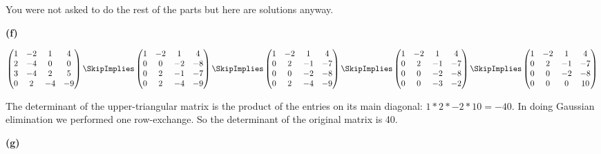 \documentclass[oneside,12pt]{amsart}
\begin{document}
\bigskip

You were not asked to do the rest of the parts but here are solutions
anyway.

\bigskip

\textbf{(f)}

\bigskip

$
\begin{pmatrix}
1 & -2 & 1 & 4 \\
2 & -4 & 0 & 0 \\
3 & -4 & 2 & 5 \\
0 & 2 & -4 & -9
\end{pmatrix}
\SkipImplies
\begin{pmatrix}
1 & -2 & 1 & 4 \\
0 & 0 & -2 & -8 \\
0 & 2 & -1 & -7 \\
0 & 2 & -4 & -9
\end{pmatrix}
\SkipImplies
\begin{pmatrix}
1 & -2 & 1 & 4 \\
0 & 2 & -1 & -7 \\
0 & 0 & -2 & -8 \\
0 & 2 & -4 & -9
\end{pmatrix}
\SkipImplies
\begin{pmatrix}
1 & -2 & 1 & 4 \\
0 & 2 & -1 & -7 \\
0 & 0 & -2 & -8 \\
0 & 0 & -3 & -2
\end{pmatrix}
\SkipImplies
\begin{pmatrix}
1 & -2 & 1 & 4 \\
0 & 2 & -1 & -7 \\
0 & 0 & -2 & -8 \\
0 & 0 & 0 & 10
\end{pmatrix}
$

The determinant of the upper-triangular matrix is the product of the
entries on its main diagonal: $1*2*-2*10=-40$. In doing Gaussian elimination
we performed one row-exchange. So the determinant of the original matrix is 40.


\bigskip

\textbf{(g)}

\bigskip
\end{document}
